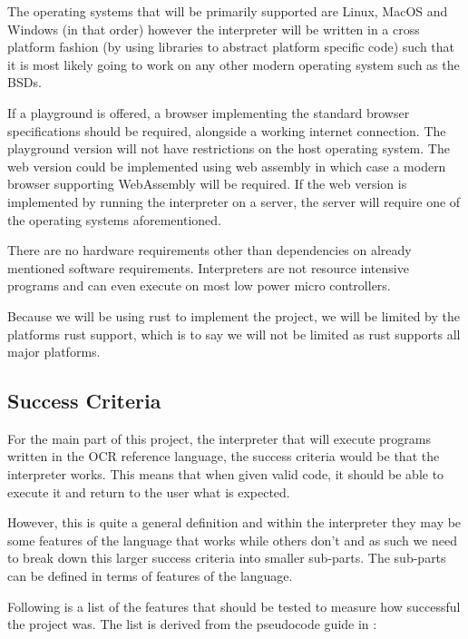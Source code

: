 \documentclass{article}
\begin{document}
The operating systems that will be primarily supported are Linux, MacOS and
Windows (in that order) however the interpreter will be written in a cross
platform fashion (by using libraries to abstract platform specific code) such
that it is most likely going to work on any other modern operating system such
as the BSDs.

If a playground is offered, a browser implementing the standard browser
specifications should be required, alongside a working internet connection. The
playground version will not have restrictions on the host operating system. The
web version could be implemented using web assembly in which case a modern
browser supporting WebAssembly will be required. If the web version is
implemented by running the interpreter on a server, the server will require one
of the operating systems aforementioned.

There are no hardware requirements other than dependencies on already mentioned
software requirements. Interpreters are not resource intensive programs and can
even execute on most low power micro controllers\cite{micropython}.

Because we will be using rust to implement the project, we will be limited by
the platforms rust support, which is to say we will not be limited as rust
supports all major platforms\cite{rustPlatformSupport}.

\subsection{Success Criteria}

For the main part of this project, the interpreter that will execute programs
written in the OCR reference language, the success criteria would be that the
interpreter works. This means that when given valid code, it should be able to
execute it and return to the user what is expected.

However, this is quite a general definition and within the interpreter they may
be some features of the language that works while others don't and as such we
need to break down this larger success criteria into smaller sub-parts. The
sub-parts can be defined in terms of features of the language.

Following is a list of the features that should be tested to measure how
successful the project was. The list is derived from the pseudocode guide in
:
\end{document}
